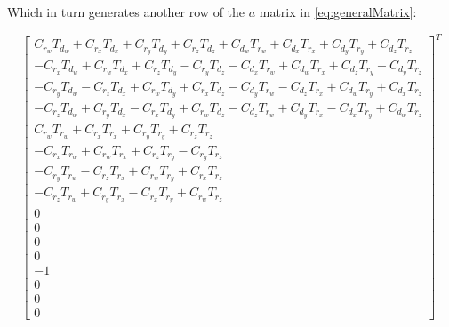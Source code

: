 \documentclass[12pt]{article}
\begin{document}
 Which in turn generates another row of the $a$ matrix in \autoref{eq:generalMatrix}:

 \begin{equation}
     \begin{bmatrix}
     C_{r_w} T_{d_w}+C_{r_x} T_{d_x}+C_{r_y} T_{d_y}+C_{r_z} T_{d_z}+C_{d_w} T_{r_w}+C_{d_x} T_{r_x}+C_{d_y} T_{r_y}+C_{d_z} T_{r_z}\\
     -C_{r_x} T_{d_w}+C_{r_w} T_{d_x}+C_{r_z} T_{d_y}-C_{r_y} T_{d_z}-C_{d_x} T_{r_w}+C_{d_w} T_{r_x}+C_{d_z} T_{r_y}-C_{d_y} T_{r_z}\\
     -C_{r_y} T_{d_w}-C_{r_z} T_{d_x}+C_{r_w} T_{d_y}+C_{r_x} T_{d_z}-C_{d_y} T_{r_w}-C_{d_z} T_{r_x}+C_{d_w} T_{r_y}+C_{d_x} T_{r_z}\\
     -C_{r_z} T_{d_w}+C_{r_y} T_{d_x}-C_{r_x} T_{d_y}+C_{r_w} T_{d_z}-C_{d_z} T_{r_w}+C_{d_y} T_{r_x}-C_{d_x} T_{r_y}+C_{d_w} T_{r_z}\\
     C_{r_w} T_{r_w}+C_{r_x} T_{r_x}+C_{r_y} T_{r_y}+C_{r_z} T_{r_z}\\
     -C_{r_x} T_{r_w}+C_{r_w} T_{r_x}+C_{r_z} T_{r_y}-C_{r_y} T_{r_z}\\
     -C_{r_y} T_{r_w}-C_{r_z} T_{r_x}+C_{r_w} T_{r_y}+C_{r_x} T_{r_z}\\
     -C_{r_z} T_{r_w}+C_{r_y} T_{r_x}-C_{r_x} T_{r_y}+C_{r_w} T_{r_z}\\
     0 \\ 0 \\ 0 \\ 0 \\ -1 \\ 0 \\ 0 \\ 0
      \end{bmatrix}^T
  \end{equation}
  
\end{document}
